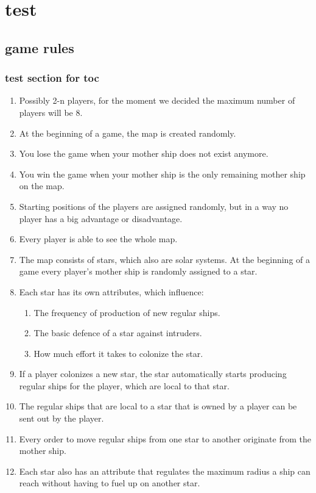 \part{test}
\chapter{game rules}
\section{test section for toc}

\begin{enumerate}
	\item Possibly 2-n players, for the moment we decided the maximum number of players will be 8.
	\item At the beginning of a game, the map is created randomly.
	\item You lose the game when your mother ship does not exist anymore.
	\item You win the game when your mother ship is the only remaining mother ship on the map.
	\item Starting positions of the players are assigned randomly, but in a way no player has a big advantage or disadvantage.
	\item Every player is able to see the whole map.
	\item The map consists of stars, which also are solar systems. At the beginning of a game every player's mother ship is randomly assigned to a star.
	\item Each star has its own attributes, which influence:  
		\begin{enumerate}[label=\alph*)]
		\item The frequency of production of new regular ships.
		\item The basic defence of a star against intruders.
		\item How much effort it takes to colonize the star.
		\end{enumerate}
		\item If a player colonizes a new star, the star automatically starts producing regular ships for the player, which are local to that star.
	\item The regular ships that are local to a star that is owned by a player can be sent out by the player.
	\item Every order to move regular ships from one star to another originate from the mother ship.
	\item Each star also has an attribute that regulates the maximum radius a ship can reach without having to fuel up on another star.

\end{enumerate}
